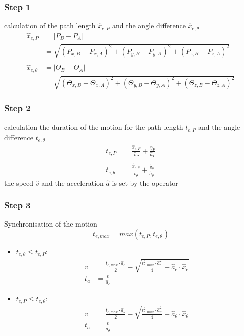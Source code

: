 \documentclass[%
  professionalfonts,%
  xcolor={%
    usenames,%
    dvipsnames,%
    svgnames,%
    table,%
    hyperref%
  }%
]{beamer}
\begin{document}
\subsubsection{Step 1}
\begin{frame}
calculation of the path length $\hat{x}_{e,P}$ and the angle difference $\hat{x}_{e,\theta}$
\begin{align*}
\hat{x}_{e,P} & = \left|P_{B} - P_{A}\right|\\
& = \sqrt{(P_{x,B} - P_{x,A})^2 + (P_{y,B} - P_{y,A})^2 + (P_{z,B} - P_{z,A})^2 }\\
\\
\hat{x}_{e,\theta} & = \left|\Theta_{B} - \Theta_{A}\right|\\
& = \sqrt{(\Theta_{x,B} - \Theta_{x,A})^2 + (\Theta_{y,B} - \Theta_{y,A})^2 + (\Theta_{z,B} - \Theta_{z,A})^2 }
\end{align*}
\end{frame}

\subsubsection{Step 2}
\begin{frame}
calculation the duration of the motion for the path length $t_{e,P}$ and the angle difference $t_{e,\theta}$
\begin{align*}
t_{e,P} & = \frac{\hat{x}_{e,P}}{\hat{v}_{P}}+\frac{\hat{v}_{P}}{\hat{a}_{P}} \\
\\
t_{e,\theta} & = \frac{\hat{x}_{e,\theta}}{\hat{v}_{\theta}}+\frac{\hat{v}_{\theta}}{\hat{a}_{\theta}}
\end{align*}
the speed $\hat{v}$ and the acceleration $\hat{a}$ is set by the operator
\end{frame}

\subsubsection{Step 3}
\begin{frame}
Synchronisation of the motion
\begin{equation*}
t_{e, max} = max\left(t_{e,P}, t_{e,\theta}\right)
\end{equation*}
\begin{itemize}
\item $t_{e,\theta} \le t_{e,P}$:
\begin{align*}
v & = \frac{t_{e,max} \cdot \hat{a}_{e}}{2}-\sqrt{\frac{t_{e,max}^2 \cdot \hat{a}_{e}^2}{4}-\hat{a}_{e}\cdot \hat{x}_{e}} \\
t_{a} & = \frac{v}{\hat{a}_{e}}
\end{align*}
\item $t_{e,P} \leq t_{e,\theta}$:
\begin{align*}
v & = \frac{t_{e,max} \cdot \hat{a}_{\theta}}{2}-\sqrt{\frac{t_{e,max}^2 \cdot \hat{a}_{\theta}^2}{4}-\hat{a}_{\theta}\cdot \hat{x}_{\theta}} \\
t_{a} & = \frac{v }{\hat{a}_{\theta}}
\end{align*}
\end{itemize}
\end{frame}
\end{document}

